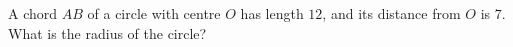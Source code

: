 A chord $AB$ of a circle with centre $O$ has length $12$, and its distance from $O$ is $7$. What is the radius of the circle?
